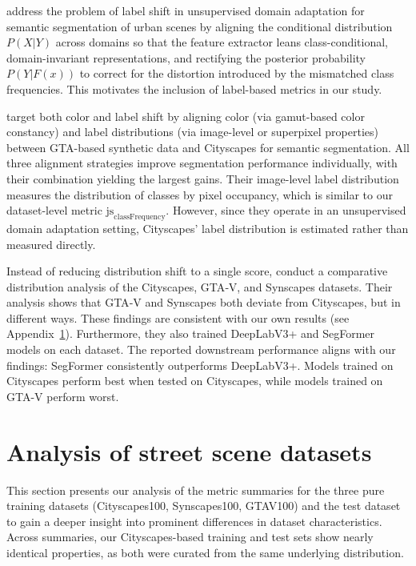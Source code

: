 \documentclass[conference]{IEEEtran}
\begin{document}
\cite{liu2022_labelShift} address the problem of label shift in unsupervised domain adaptation for semantic segmentation of urban scenes by aligning the conditional distribution $P(X|Y)$ across domains so that the feature extractor leans class-conditional, domain-invariant representations, and rectifying the posterior probability $P(Y|F(x))$ to correct for the distortion introduced by the mismatched class frequencies. This motivates the inclusion of label-based metrics in our study.

\cite{zhang2020} target both color and label shift by aligning color (via gamut-based color constancy) and label distributions (via image-level or superpixel properties) between GTA-based synthetic data and Cityscapes for semantic segmentation. All three alignment strategies improve segmentation performance individually, with their combination yielding the largest gains. Their image-level label distribution measures the distribution of classes by pixel occupancy, which is similar to our dataset-level metric $\text{js}_{\text{classFrequency}}$. However, since they operate in an unsupervised domain adaptation setting, Cityscapes' label distribution is estimated rather than measured directly.

Instead of reducing distribution shift to a single score, \cite{UrbanSyn} conduct a comparative distribution analysis of the Cityscapes, GTA‑V, and Synscapes datasets. Their analysis shows that GTA‑V and Synscapes both deviate from Cityscapes, but in different ways. These findings are consistent with our own results (see Appendix~\ref{sec:datasetAnalysis}). Furthermore, they also trained DeepLabV3+ and SegFormer models on each dataset. The reported downstream performance aligns with our findings: SegFormer consistently outperforms DeepLabV3+. Models trained on Cityscapes perform best when tested on Cityscapes, while models trained on GTA-V perform worst.

\section{Analysis of street scene datasets}
\label{sec:datasetAnalysis}
This section presents our analysis of the metric summaries for the three pure training datasets (Cityscapes100, Synscapes100, GTAV100) and the test dataset to gain a deeper insight into prominent differences in dataset characteristics. Across summaries, our Cityscapes-based training and test sets show nearly identical properties, as both were curated from the same underlying distribution.
\end{document}

